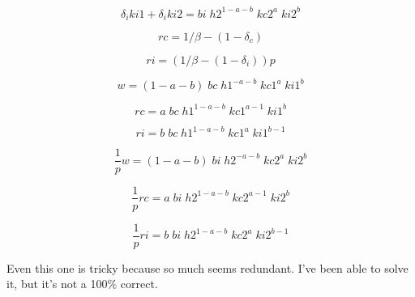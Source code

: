 \documentclass{article}
\begin{document}
\begin{equation}
\delta_i ki1 + \delta_i ki2 = bi \; h2^{1-a-b} \; kc2^{a} \; ki2^{b}
\end{equation}

\begin{equation}
rc =1/\beta -(1-\delta_c)
\end{equation}

\begin{equation}
ri =(1/\beta -(1-\delta_i))p
\end{equation}

\begin{equation}
w = (1-a-b) \; bc \; h1^{-a-b} \; kc1^{a} \; ki1^{b}
\end{equation}

\begin{equation}
rc =  a \; bc \; h1^{1-a-b} \; kc1^{a-1} \; ki1^{b}
\end{equation}

\begin{equation}
ri =  b \; bc \; h1^{1-a-b} \; kc1^{a} \; ki1^{b-1}
\end{equation}

\begin{equation}
\frac{1}{p} w = (1-a-b) \; bi \; h2^{-a-b} \; kc2^{a} \; ki2^{b}
\end{equation}

\begin{equation}
\frac{1}{p} rc  = a \; bi \; h2^{1-a-b} \; kc2^{a-1} \; ki2^{b}
\end{equation}

\begin{equation}
\frac{1}{p} ri= b \; bi \; h2^{1-a-b} \; kc2^{a} \; ki2^{b-1}
\end{equation}

Even this one is tricky because so much seems redundant. I've been able to solve it, but it's not a 100\% correct. 

\end{document}
